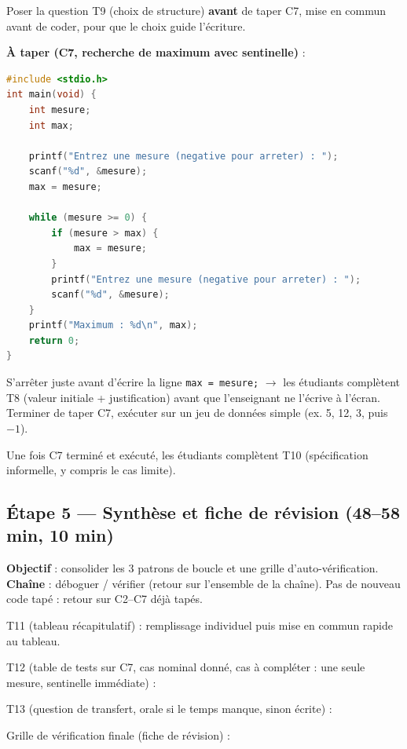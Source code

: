 \documentclass[cours, noCustomPackages]{UPSTI_Document}
\begin{document}
Poser la question T9 (choix de structure) \textbf{avant} de taper C7, mise en
commun avant de coder, pour que le choix guide l'écriture.

\TrouNeuf

\textbf{À taper (C7, recherche de maximum avec sentinelle)} :
\begin{lstlisting}[language=c]
#include <stdio.h>
int main(void) {
    int mesure;
    int max;

    printf("Entrez une mesure (negative pour arreter) : ");
    scanf("%d", &mesure);
    max = mesure;

    while (mesure >= 0) {
        if (mesure > max) {
            max = mesure;
        }
        printf("Entrez une mesure (negative pour arreter) : ");
        scanf("%d", &mesure);
    }
    printf("Maximum : %d\n", max);
    return 0;
}
\end{lstlisting}
S'arrêter juste avant d'écrire la ligne \texttt{max = mesure;} $\to$ les
étudiants complètent T8 (valeur initiale + justification) avant que
l'enseignant ne l'écrive à l'écran. Terminer de taper C7, exécuter sur un jeu
de données simple (ex. 5, 12, 3, puis $-1$).

\TrouHuit

Une fois C7 terminé et exécuté, les étudiants complètent T10 (spécification
informelle, y compris le cas limite).

\TrouDix

\subsection*{Étape 5 --- Synthèse et fiche de révision (48--58 min, 10 min)}

\textbf{Objectif} : consolider les 3 patrons de boucle et une grille
d'auto-vérification. \textbf{Chaîne} : déboguer / vérifier (retour sur
l'ensemble de la chaîne). Pas de nouveau code tapé : retour sur C2--C7 déjà
tapés.

T11 (tableau récapitulatif) : remplissage individuel puis mise en commun
rapide au tableau.

\TableRecapBoucles

T12 (table de tests sur C7, cas nominal donné, cas à compléter : une seule
mesure, sentinelle immédiate) :

\TableTestsCSept
\TrouDouzeCorrection

T13 (question de transfert, orale si le temps manque, sinon écrite) :

\TrouTreize

Grille de vérification finale (fiche de révision) :
\end{document}
